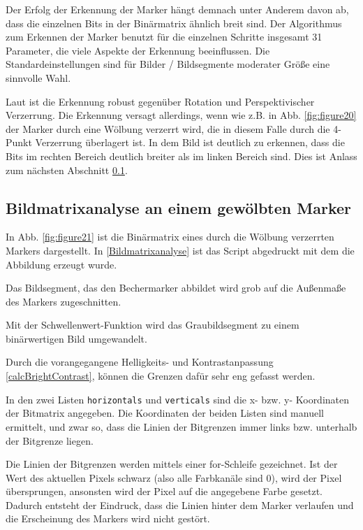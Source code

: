     Der Erfolg der Erkennung der Marker hängt demnach unter Anderem davon ab, dass die einzelnen Bits in der Binärmatrix ähnlich breit sind. 
    Der Algorithmus zum Erkennen der Marker benutzt für die einzelnen Schritte insgesamt 31 Parameter, die viele Aspekte der Erkennung beeinflussen.
    Die Standardeinstellungen sind für Bilder / Bildsegmente moderater Größe eine sinnvolle Wahl. 
    
    Laut \cite[OpenCV]{OpenCVaruco} ist die Erkennung robust gegenüber Rotation und Perspektivischer Verzerrung. 
    Die Erkennung versagt allerdings, wenn wie z.B. in Abb. \ref{fig:figure20} der Marker durch eine Wölbung verzerrt wird, die in diesem Falle durch die 4-Punkt Verzerrung überlagert ist.
    In dem Bild ist deutlich zu erkennen, dass die Bits im rechten Bereich deutlich breiter als im linken Bereich sind. 
    Dies ist Anlass zum nächsten Abschnitt \ref{ChapBildmatrixanalyse}.

    \subsection{Bildmatrixanalyse an einem gewölbten Marker}\label{ChapBildmatrixanalyse}

    In Abb. \ref{fig:figure21} ist die Binärmatrix eines durch die Wölbung verzerrten Markers dargestellt. 
    In \ref{Bildmatrixanalyse} ist das Script abgedruckt mit dem die Abbildung erzeugt wurde.

    Das Bildsegment, das den Bechermarker abbildet wird grob auf die Außenmaße des Markers zugeschnitten.

    Mit der Schwellenwert-Funktion wird das Graubildsegment zu einem binärwertigen Bild umgewandelt.

    Durch die vorangegangene Helligkeits- und Kontrastanpassung \ref{calcBrightContrast}, können die Grenzen dafür sehr eng gefasst werden.
    
    In den zwei Listen \verb|horizontals| und \verb|verticals| sind die x- bzw. y- Koordinaten der Bitmatrix angegeben. 
    Die Koordinaten der beiden Listen sind manuell ermittelt, und zwar so, dass die Linien der Bitgrenzen immer links bzw. unterhalb der Bitgrenze liegen.

    Die Linien der Bitgrenzen werden mittels einer for-Schleife gezeichnet. 
    Ist der Wert des aktuellen Pixels schwarz (also alle Farbkanäle sind 0), wird der Pixel übersprungen, ansonsten wird der Pixel auf die angegebene Farbe gesetzt. 
    Dadurch entsteht der Eindruck, dass die Linien hinter dem Marker verlaufen und die Erscheinung des Markers wird nicht gestört. 
    
